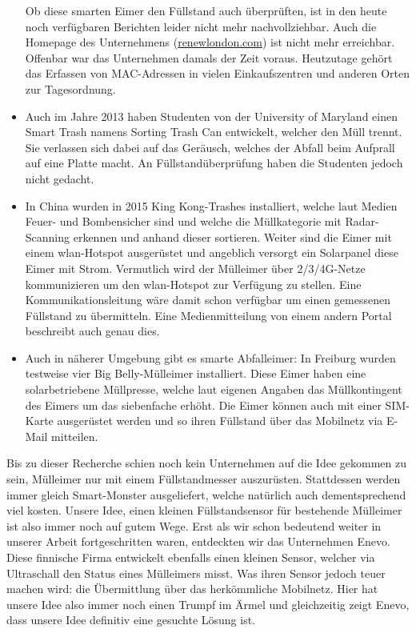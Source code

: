 \begin{itemize}
  Ob diese smarten Eimer den Füllstand auch überprüften, ist in den heute noch verfügbaren Berichten leider nicht mehr nachvollziehbar. Auch die Homepage des Unternehmens (\url{renewlondon.com}) ist nicht mehr erreichbar. Offenbar war das Unternehmen damals der Zeit voraus. Heutzutage gehört das Erfassen von MAC-Adressen in vielen Einkaufszentren und anderen Orten zur Tagesordnung. 
  \item Auch im Jahre 2013 haben Studenten von der University of Maryland einen \glqq{}Smart Trash\grqq{} namens \glqq{}Sorting Trash Can\grqq{}\autocite{market:sortingTrashCan} entwickelt, welcher den Müll trennt. Sie verlassen sich dabei auf das Geräusch, welches der Abfall beim Aufprall auf eine Platte macht. An Füllstandüberprüfung haben die Studenten jedoch nicht gedacht.
  \item In China wurden in 2015 \glqq{}King Kong-Trashes\grqq{}\autocite{market:ChinaTrash} installiert, welche laut Medien Feuer- und Bombensicher sind und welche die Müllkategorie mit Radar-Scanning erkennen und anhand dieser sortieren. Weiter sind die Eimer mit einem \gls{wlan}-Hotspot ausgerüstet und angeblich versorgt ein Solarpanel diese Eimer mit Strom. Vermutlich wird der Mülleimer über 2/3/4G-Netze kommunizieren um den \gls{wlan}-Hotspot zur Verfügung zu stellen. Eine Kommunikationsleitung wäre damit schon verfügbar um einen gemessenen Füllstand zu übermitteln. Eine Medienmitteilung von einem andern Portal beschreibt auch genau dies\autocite{market:ChinaTrash2}.
  
  \item Auch in näherer Umgebung gibt es smarte Abfalleimer: In Freiburg wurden testweise vier \glqq{}Big Belly\grqq{}-Mülleimer installiert\autocite{market:BigBelly}. Diese Eimer haben eine solarbetriebene Müllpresse, welche laut eigenen Angaben das Müllkontingent des Eimers um das siebenfache erhöht. Die Eimer können auch mit einer SIM-Karte ausgerüstet werden und so ihren Füllstand über das Mobilnetz via E-Mail mitteilen.
\end{itemize}

Bis zu dieser Recherche schien noch kein Unternehmen auf die Idee gekommen zu sein, Mülleimer \glqq{}nur\grqq{} mit einem Füllstandmesser auszurüsten. Stattdessen werden immer gleich \glqq{}Smart-Monster\grqq{} ausgeliefert, welche natürlich auch dementsprechend viel kosten. Unsere Idee, einen kleinen Füllstandsensor für bestehende Mülleimer ist also immer noch auf gutem Wege. Erst als wir schon bedeutend weiter in unserer Arbeit fortgeschritten waren, entdeckten wir das Unternehmen Enevo\autocite{market:Enevo}. Diese finnische Firma entwickelt ebenfalls einen kleinen Sensor, welcher via Ultraschall den Status eines Mülleimers misst. Was ihren Sensor jedoch teuer machen wird: die Übermittlung über das herkömmliche Mobilnetz. Hier hat unsere Idee also immer noch einen Trumpf im Ärmel und gleichzeitig zeigt Enevo, dass unsere Idee definitiv eine gesuchte Lösung ist.

